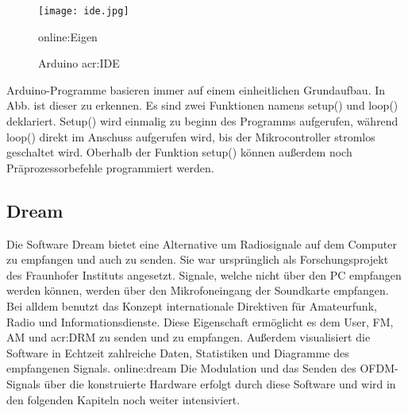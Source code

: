 \begin{figure}[H]
	\centering
	\texttt{[image: ide.jpg]}
	\caption[Arduino \gls{acr:IDE}]{Arduino \gls{acr:IDE}}\gls{online:Eigen}
	\label{fig:ide}
\end{figure}

Arduino-Programme basieren immer auf einem einheitlichen Grundaufbau. In Abb. ist
dieser zu erkennen. Es sind zwei Funktionen namens setup() und loop() deklariert.
Setup() wird einmalig zu beginn des Programms aufgerufen, während loop() direkt im Anschuss aufgerufen wird, bis der Mikrocontroller stromlos geschaltet wird. Oberhalb der Funktion setup() können außerdem noch Präprozessorbefehle programmiert werden.

\subsection{Dream}
\label{subsec:dreamsoft}
Die Software Dream bietet eine Alternative um Radiosignale auf dem Computer zu empfangen und auch zu senden. Sie war ursprünglich als Forschungsprojekt des Fraunhofer Instituts angesetzt. Signale, welche nicht über den PC empfangen werden können, werden über den Mikrofoneingang der Soundkarte empfangen.
Bei alldem benutzt das Konzept internationale Direktiven für Amateurfunk, Radio und Informationsdienste.
Diese Eigenschaft ermöglicht es dem User, FM, AM und \gls{acr:DRM} zu senden und zu empfangen. Außerdem visualisiert die Software in Echtzeit zahlreiche Daten, Statistiken und Diagramme des empfangenen Signals. \gls{online:dream} Die Modulation und das Senden des OFDM-Signals über die konstruierte Hardware erfolgt durch diese Software und wird in den folgenden Kapiteln noch weiter intensiviert.